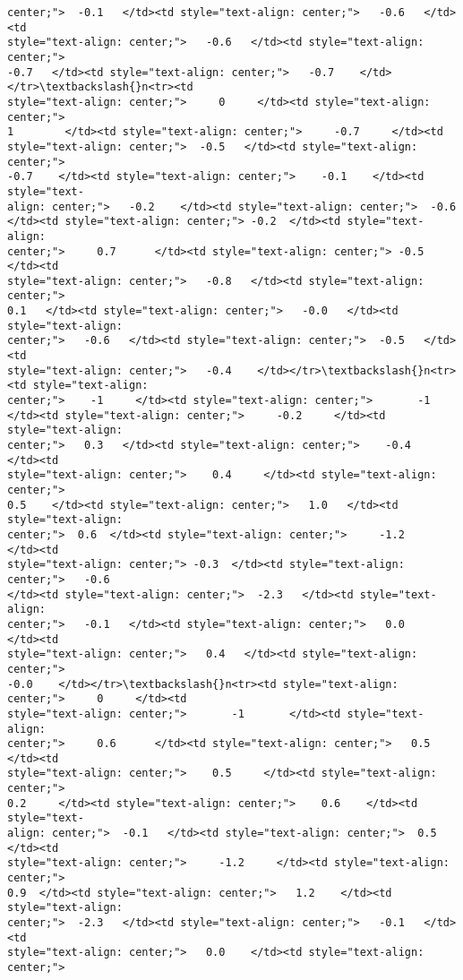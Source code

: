 \documentclass[11pt]{article}
\begin{document}
\begin{tcolorbox}[breakable, size=fbox, boxrule=.5pt, pad at break*=1mm, opacityfill=0]
\begin{Verbatim}[commandchars=\\\{\}]
center;">  -0.1   </td><td style="text-align: center;">   -0.6   </td><td
style="text-align: center;">   -0.6   </td><td style="text-align: center;">
-0.7   </td><td style="text-align: center;">   -0.7    </td></tr>\textbackslash{}n<tr><td
style="text-align: center;">     0     </td><td style="text-align: center;">
1        </td><td style="text-align: center;">     -0.7     </td><td
style="text-align: center;">  -0.5   </td><td style="text-align: center;">
-0.7    </td><td style="text-align: center;">    -0.1    </td><td style="text-
align: center;">   -0.2    </td><td style="text-align: center;">  -0.6
</td><td style="text-align: center;"> -0.2  </td><td style="text-align:
center;">     0.7      </td><td style="text-align: center;"> -0.5  </td><td
style="text-align: center;">   -0.8   </td><td style="text-align: center;">
0.1   </td><td style="text-align: center;">   -0.0   </td><td style="text-align:
center;">   -0.6   </td><td style="text-align: center;">  -0.5   </td><td
style="text-align: center;">   -0.4    </td></tr>\textbackslash{}n<tr><td style="text-align:
center;">    -1     </td><td style="text-align: center;">       -1
</td><td style="text-align: center;">     -0.2     </td><td style="text-align:
center;">   0.3   </td><td style="text-align: center;">    -0.4    </td><td
style="text-align: center;">    0.4     </td><td style="text-align: center;">
0.5    </td><td style="text-align: center;">   1.0   </td><td style="text-align:
center;">  0.6  </td><td style="text-align: center;">     -1.2     </td><td
style="text-align: center;"> -0.3  </td><td style="text-align: center;">   -0.6
</td><td style="text-align: center;">  -2.3   </td><td style="text-align:
center;">   -0.1   </td><td style="text-align: center;">   0.0    </td><td
style="text-align: center;">   0.4   </td><td style="text-align: center;">
-0.0    </td></tr>\textbackslash{}n<tr><td style="text-align: center;">     0     </td><td
style="text-align: center;">       -1       </td><td style="text-align:
center;">     0.6      </td><td style="text-align: center;">   0.5   </td><td
style="text-align: center;">    0.5     </td><td style="text-align: center;">
0.2     </td><td style="text-align: center;">    0.6    </td><td style="text-
align: center;">  -0.1   </td><td style="text-align: center;">  0.5  </td><td
style="text-align: center;">     -1.2     </td><td style="text-align: center;">
0.9  </td><td style="text-align: center;">   1.2    </td><td style="text-align:
center;">  -2.3   </td><td style="text-align: center;">   -0.1   </td><td
style="text-align: center;">   0.0    </td><td style="text-align: center;">

\end{Verbatim}
\end{tcolorbox}
\end{document}
